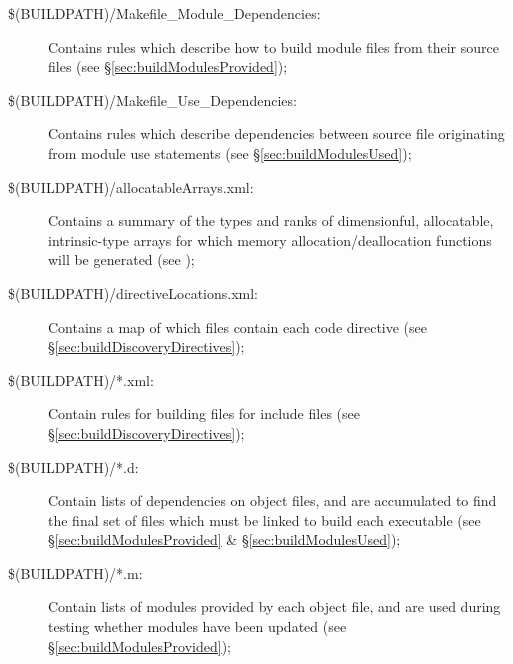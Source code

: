 \begin{description}
\item[{\normalfont \ttfamily \$(BUILDPATH)/Makefile\_Module\_Dependencies}:] Contains rules which describe how to build module files from their source files (see \S\ref{sec:buildModulesProvided});

\item[{\normalfont \ttfamily \$(BUILDPATH)/Makefile\_Use\_Dependencies}:] Contains rules which describe dependencies between source file originating from module {\normalfont \ttfamily use} statements (see \S\ref{sec:buildModulesUsed});

\item[{\normalfont \ttfamily \$(BUILDPATH)/allocatableArrays.xml}:] Contains a summary of the types and ranks of dimensionful, allocatable, intrinsic-type arrays for which memory allocation/deallocation functions will be generated (see \label{sec:buildDiscoverAllocatables});

\item[{\normalfont \ttfamily \$(BUILDPATH)/directiveLocations.xml}:] Contains a map of which files contain each code directive (see \S\ref{sec:buildDiscoveryDirectives});

\item[{\normalfont \ttfamily \$(BUILDPATH)/*.xml}:] Contain rules for building files for {\normalfont \ttfamily include} files (see \S\ref{sec:buildDiscoveryDirectives});

\item[{\normalfont \ttfamily \$(BUILDPATH)/*.d}:] Contain lists of dependencies on object files, and are accumulated to find the final set of files which must be linked to build each executable (see \S\ref{sec:buildModulesProvided} \& \S\ref{sec:buildModulesUsed});

\item[{\normalfont \ttfamily \$(BUILDPATH)/*.m}:] Contain lists of modules provided by each object file, and are used during testing whether modules have been updated (see \S\ref{sec:buildModulesProvided});


\end{description}
